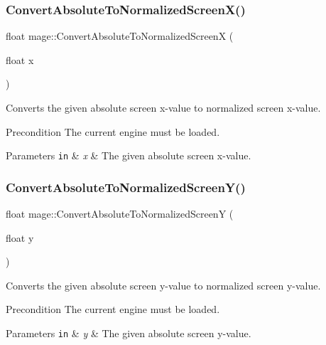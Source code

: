 \subsubsection{\texorpdfstring{Convert\+Absolute\+To\+Normalized\+Screen\+X()}{ConvertAbsoluteToNormalizedScreenX()}}
{\footnotesize\ttfamily float mage\+::\+Convert\+Absolute\+To\+Normalized\+ScreenX (\begin{DoxyParamCaption}\item[{float}]{x }\end{DoxyParamCaption})}

Converts the given absolute screen x-\/value to normalized screen x-\/value.

\begin{DoxyPrecond}{Precondition}
The current engine must be loaded. 
\end{DoxyPrecond}

\begin{DoxyParams}[1]{Parameters}
\mbox{\tt in}  & {\em x} & The given absolute screen x-\/value. \\
\hline
\end{DoxyParams}
\hypertarget{namespacemage_a4300e91e448d76e1015cbc806c1d4467}{}\label{namespacemage_a4300e91e448d76e1015cbc806c1d4467} 
\subsubsection{\texorpdfstring{Convert\+Absolute\+To\+Normalized\+Screen\+Y()}{ConvertAbsoluteToNormalizedScreenY()}}
{\footnotesize\ttfamily float mage\+::\+Convert\+Absolute\+To\+Normalized\+ScreenY (\begin{DoxyParamCaption}\item[{float}]{y }\end{DoxyParamCaption})}

Converts the given absolute screen y-\/value to normalized screen y-\/value.

\begin{DoxyPrecond}{Precondition}
The current engine must be loaded. 
\end{DoxyPrecond}

\begin{DoxyParams}[1]{Parameters}
\mbox{\tt in}  & {\em y} & The given absolute screen y-\/value. \\
\hline
\end{DoxyParams}
\hypertarget{namespacemage_a37cd57f31a66aac5355061bc3ad4e5ec}{}\label{namespacemage_a37cd57f31a66aac5355061bc3ad4e5ec} 

